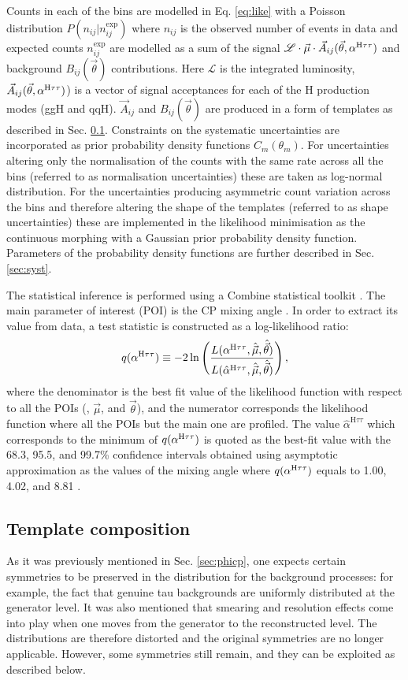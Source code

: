 Counts in each of the bins are modelled in Eq. \ref{eq:like} with a Poisson distribution $P(n_{ij}|n_{ij}^\text{exp})$ where $n_{ij}$ is the observed number of events in data and expected counts $n_{ij}^\text{exp}$ are modelled as a sum of the signal $\mathcal{L} \cdot \vec{\mu} \cdot \vec{A}_{ij}(\vec{\theta}, \alpha^{\text{H}\tau\tau})$ and background $B_{ij}(\vec{\theta})$ contributions. Here $\mathcal{L}$ is the integrated luminosity, $\vec{A}_{ij}(\vec{\theta}, \alpha^{\text{H}\tau\tau})$) is a vector of signal acceptances for each of the H production modes (ggH and qqH). $\vec{A}_{ij}$ and $B_{ij}(\vec{\theta})$ are produced in a form of templates as described in Sec. \ref{sec:temp}. Constraints on the systematic uncertainties are incorporated as prior probability density functions $C_m(\theta_m)$. For uncertainties altering only the normalisation of the counts with the same rate across all the bins (referred to as normalisation uncertainties) these are taken as log-normal distribution. For the uncertainties producing asymmetric count variation across the bins and therefore altering the shape of the templates (referred to as shape uncertainties) these are implemented in the likelihood minimisation as the continuous morphing with a Gaussian prior probability density
function. Parameters of the probability density functions are further described in Sec. \ref{sec:syst}.

The statistical inference is performed using a Combine statistical toolkit \cite{combine}. The main parameter of interest (POI) is the CP mixing angle \mixa. In order to extract its value from data, a test statistic is constructed as a log-likelihood ratio:
\begin{equation}
    q(\alpha^{\text{H}\tau\tau}) \equiv -2\ln\left(\dfrac{L(\alpha^{\text{H}\tau\tau}, \hat{\vec{\mu}}, \hat{\vec{\theta}})}{L(\hat{\alpha}^{\text{H}\tau\tau}, \hat{\vec{\mu}}, \hat{\vec{\theta}})}\right),
\end{equation}
where the denominator is the best fit value of the likelihood function with respect to all the POIs (\mixa, $\vec{\mu}$, and $\vec{\theta}$), and the numerator corresponds the likelihood function where all the POIs but the main one are profiled. The value $\hat{\alpha}^{\text{H}\tau\tau}$ which corresponds to the minimum of $q(\alpha^{\text{H}\tau\tau})$ is quoted as the best-fit value with the 68.3, 95.5, and 99.7\% confidence intervals obtained using asymptotic approximation as the values of the mixing angle \mixa where $q(\alpha^{\text{H}\tau\tau})$ equals to 1.00, 4.02, and 8.81 \cite{Cowan:2010js}.

\subsection{Template composition}\label{sec:temp}
As it was previously mentioned in Sec. \ref{sec:phicp}, one expects certain symmetries to be preserved in the \phicp distribution for the background processes: for example, the fact that genuine tau backgrounds are uniformly distributed at the generator level. It was also mentioned that smearing and resolution effects come into play when one moves from the generator to the reconstructed level. The distributions are therefore distorted and the original symmetries are no longer applicable. However, some symmetries still remain, and they can be exploited as described below.


